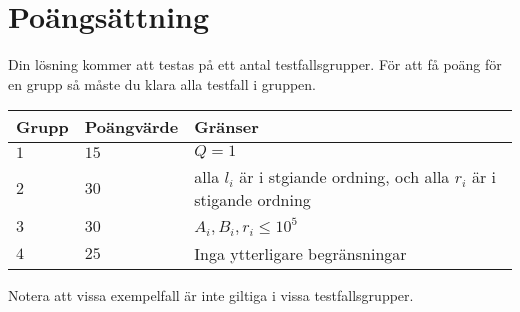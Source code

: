 \section*{Poängsättning}
Din lösning kommer att testas på ett antal testfallsgrupper.
För att få poäng för en grupp så måste du klara alla testfall i gruppen.

\noindent
\begin{tabular}{| l | l | l |}
  \hline
  Grupp & Poängvärde & Gränser \\ \hline
  $1$   & $15$        & $Q=1$  \\ \hline
  $2$   & $30$       & alla $l_i$ är i stgiande ordning, och alla $r_i$ är i stigande ordning \\ \hline
  $3$   & $30$       & $ A_i,B_i,r_i \leq 10^5$ \\ \hline
  $4$   & $25$       & Inga ytterligare begränsningar \\ \hline
\end{tabular}

Notera att vissa exempelfall är inte giltiga i vissa testfallsgrupper.

